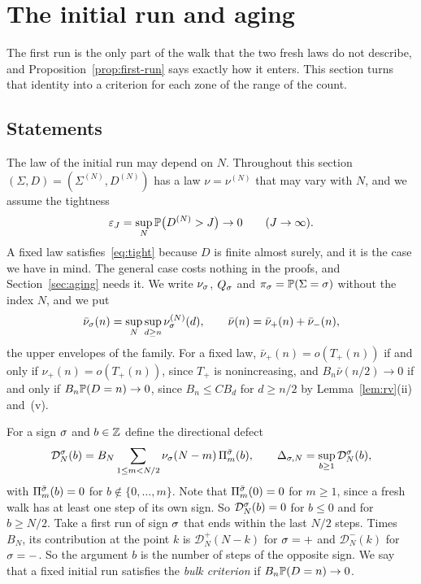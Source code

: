 \section{The initial run and aging}\label{sec:preparation}

The first run is the only part of the walk that the two fresh laws do not
describe, and Proposition~\ref{prop:first-run} says exactly how it enters. This
section turns that identity into a criterion for each zone of the range of the count.

\subsection{Statements}\label{sec:prep-statements}

The law of the initial run may depend on $N$. Throughout this section
$(\Sigma,D)=(\Sigma^{(N)},D^{(N)})$ has a law $\nu=\nu^{(N)}$ that may vary with $N$, and we
assume the tightness
\begin{equation}\label{eq:tight}
 \varepsilon_J=\sup_N\mathbb{P}\bigl(D^{(N)}>J\bigr)\to0\qquad(J\to\infty).
\end{equation}
A fixed law satisfies~\eqref{eq:tight} because $D$ is finite almost surely, and it is the case
we have in mind. The general case costs nothing in the proofs, and Section~\ref{sec:aging}
needs it. We write $\nu_\sigma$, $Q_\sigma$ and $\pi_\sigma=\mathbb{P}(\Sigma=\sigma)$ without the index $N$,
and we put
\begin{equation}\label{eq:envelope}
 \bar\nu_\sigma(n)=\sup_N\sup_{d\ge n}\nu^{(N)}_\sigma(d),\qquad\bar\nu(n)=\bar\nu_{+}(n)+\bar\nu_{-}(n),
\end{equation}
the upper envelopes of the family. For a fixed law, $\bar\nu_\plus(n)=o(T_\plus(n))$ if and only
if $\nu_\plus(n)=o(T_\plus(n))$, since $T_\plus$ is nonincreasing, and $B_n\bar\nu(n/2)\to0$ if
and only if $B_n\mathbb{P}(D=n)\to0$, since $B_n\le CB_d$ for $d\ge n/2$ by Lemma~\ref{lem:rv}(ii)
and~(v).

For a sign $\sigma$ and $b\in\mathbb{Z}$ define the directional defect
\begin{equation}\label{eq:defect}
 \mathcal D^\sigma_N(b)=B_N\sum_{1\le m<N/2}\nu_\sigma(N-m)\,\Pi^{\bar\sigma}_m(b),\qquad
 \Delta_{\sigma,N}=\sup_{b\ge1}\mathcal D^\sigma_N(b),
\end{equation}
with $\Pi^{\bar\sigma}_m(b)=0$ for $b\notin\{0,\dots,m\}$. Note that $\Pi^{\bar\sigma}_m(0)=0$
for $m\ge1$, since a fresh walk has at least one step of its own sign. So
$\mathcal D^\sigma_N(b)=0$ for $b\le0$ and for $b\ge N/2$. Take a first run of sign
$\sigma$ that ends within the last $N/2$ steps. Times $B_N$, its contribution at the
point $k$ is $\mathcal D^\plus_N(N-k)$ for $\sigma={+}$ and $\mathcal D^\minus_N(k)$ for
$\sigma={-}$. So the argument $b$ is the number of steps of the opposite sign. We
say that a fixed initial run satisfies the \emph{bulk criterion} if
$B_n\mathbb{P}(D=n)\to0$.

